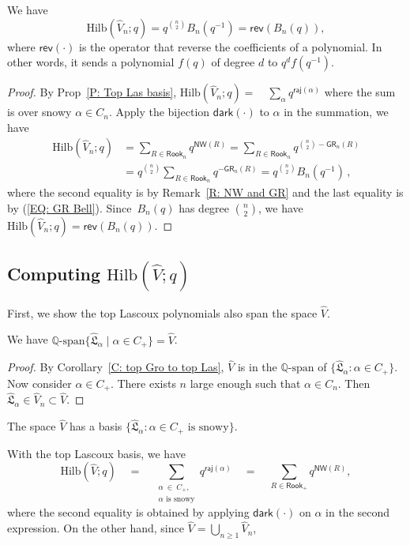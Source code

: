 \documentclass[ALCO]{cedram}
\newcommand{\fL}{\mathfrak{L}}
\newcommand{\topLas}{\widehat{\fL}}
\newcommand{\rev}{\mathsf{rev}}
\newcommand{\Q}{\mathbb{Q}}
\newcommand{\dark}{\mathsf{dark}}
\newcommand{\raj}{\mathsf{raj}}
\newcommand{\Rook}{\mathsf{Rook}}
\newcommand{\GR}{\mathsf{GR}}
\newcommand{\NW}{\mathsf{NW}}
\newcommand{\Hilb}{\mathrm{Hilb}}
\begin{document}
\begin{prop}
\label{T: F_n}
We have
$$
\Hilb(\widehat{V}_n;q) 
= q^{{\binom{n}{2}}} B_{n}(q^{-1})
= \rev(B_n(q)),
$$
where $\rev(\cdot)$ is the operator that
reverse the coefficients of a polynomial.
In other words, it sends a polynomial $f(q)$
of degree $d$ to $q^d f(q^{-1})$.
\end{prop}
\begin{proof}

By Prop~\ref{P: Top Las basis},
$
\Hilb(\widehat{V}_n;q) = \quad \sum_{\alpha} q^{\raj(\alpha)}$
where the sum is over snowy $\alpha \in C_n$.
Apply the bijection $\dark(\cdot)$
to $\alpha$ in the summation, we have
\begin{align*}
\Hilb(\widehat{V}_n;q) & = \sum_{R \in \Rook_n} q^{\NW(R)} =\sum_{R \in \Rook_n} q^{{\binom{n}{2}} - \GR_n(R)}\\
&=q^{\binom{n}{2}}\sum_{R \in \Rook_n} q^{-\GR_n(R)} = q^{{\binom{n}{2}}} B_{n}(q^{-1})\,,
\end{align*}
where the second equality is by 
Remark~\ref{R: NW and GR}
and the last equality is by (\ref{EQ: GR Bell}).
Since~$B_n(q)$ has degree ${\binom{n}{2}}$, we have $\Hilb(\widehat{V}_n;q) = \rev(B_n(q))$.
\end{proof}

\subsection{Computing  \texorpdfstring{$\Hilb(\widehat{V};q)$}{TEXT}}\label{subsec.v.hat}

First, we show the top Lascoux polynomials also span the space $\widehat{V}$.
\begin{prop}
\label{P: V span}
We have $\Q\textrm{-span}\{\topLas_\alpha \mid \alpha \in C_+\} = \widehat{V}$.
\end{prop}
\begin{proof}
By Corollary~\ref{C: top Gro to top Las},
$\widehat{V}$ is in the $\Q\textrm{-span}$ of 
$\{\topLas_\alpha: \alpha \in C_+\}$.
Now consider $\alpha \in C_+$.
There exists $n$ large enough such that
$\alpha \in C_n$.
Then $\topLas_\alpha \in \widehat{V}_n \subset \widehat{V}$.
\end{proof}

\begin{cor}
The space $\widehat{V}$
has a basis 
$\{ \topLas_\alpha: \alpha \in C_+ \textrm{ is snowy}\}.$
\end{cor}

With the top Lascoux basis, we have
$$
\Hilb(\widehat{V};q)  \quad = \quad \sum_{\substack{\alpha \: \in \: C_+, \\ 
\alpha \textrm{ is snowy}}} q^{\raj(\alpha)} \quad
= \quad \sum_{R \in \Rook_+} q^{\NW(R)},$$
where the second equality is obtained by 
applying $\dark(\cdot)$ on $\alpha$ in the second expression.
On the other hand, since $\widehat{V} = \bigcup_{n \geq 1} \widehat{V}_n$, 
\end{document}
